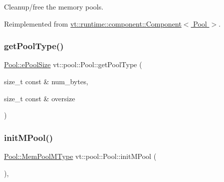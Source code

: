 Cleanup/free the memory pools. 



Reimplemented from \hyperlink{structvt_1_1runtime_1_1component_1_1_component_a098e362de01af6054e5491fba671a959}{vt\+::runtime\+::component\+::\+Component$<$ Pool $>$}.

\mbox{\label{structvt_1_1pool_1_1_pool_a9aa5afbbea5a61265746c4d461502d62}} 
\subsubsection{\texorpdfstring{get\+Pool\+Type()}{getPoolType()}}
{\footnotesize\ttfamily \hyperlink{structvt_1_1pool_1_1_pool_ace8d36439e5e599a8ee68b2f1a6a6b28}{Pool\+::e\+Pool\+Size} vt\+::pool\+::\+Pool\+::get\+Pool\+Type (\begin{DoxyParamCaption}\item[{size\+\_\+t const \&}]{num\+\_\+bytes,  }\item[{size\+\_\+t const \&}]{oversize }\end{DoxyParamCaption})}

\mbox{\label{structvt_1_1pool_1_1_pool_ab768c364b348107112f960ce0704565d}} 
\subsubsection{\texorpdfstring{init\+M\+Pool()}{initMPool()}}
{\footnotesize\ttfamily \hyperlink{structvt_1_1pool_1_1_pool_a8a201b9a843e47cd4e7b568a8e4483da}{Pool\+::\+Mem\+Pool\+M\+Type} vt\+::pool\+::\+Pool\+::init\+M\+Pool (\begin{DoxyParamCaption}{ }\end{DoxyParamCaption})\hspace{0.3cm}{\ttfamily [static]}, {\ttfamily [private]}}

\mbox{\label{structvt_1_1pool_1_1_pool_a833da3cd4d410ba607b6e7b000810882}} 
